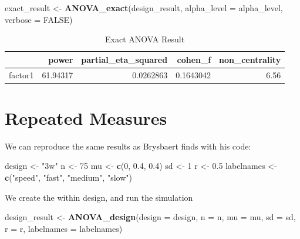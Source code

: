 \documentclass[
]{book}
\newenvironment{Shaded}{\begin{snugshade}}{\end{snugshade}}
\newcommand{\DataTypeTok}[1]{\textcolor[rgb]{0.13,0.29,0.53}{#1}}
\newcommand{\DecValTok}[1]{\textcolor[rgb]{0.00,0.00,0.81}{#1}}
\newcommand{\FloatTok}[1]{\textcolor[rgb]{0.00,0.00,0.81}{#1}}
\newcommand{\KeywordTok}[1]{\textcolor[rgb]{0.13,0.29,0.53}{\textbf{#1}}}
\newcommand{\NormalTok}[1]{#1}
\newcommand{\OtherTok}[1]{\textcolor[rgb]{0.56,0.35,0.01}{#1}}
\newcommand{\StringTok}[1]{\textcolor[rgb]{0.31,0.60,0.02}{#1}}
\begin{document}
\begin{Shaded}
\begin{Highlighting}[]
\NormalTok{exact_result <-}\StringTok{ }\KeywordTok{ANOVA_exact}\NormalTok{(design_result,}
                            \DataTypeTok{alpha_level =}\NormalTok{ alpha_level,}
                            \DataTypeTok{verbose =} \OtherTok{FALSE}\NormalTok{)}
\end{Highlighting}
\end{Shaded}

\begin{table}[!h]

\caption{\label{tab:unnamed-chunk-336}Exact ANOVA Result}
\centering
\begin{tabular}[t]{l|r|r|r|r}
\hline
  & power & partial\_eta\_squared & cohen\_f & non\_centrality\\
\hline
factor1 & 61.94317 & 0.0262863 & 0.1643042 & 6.56\\
\hline
\end{tabular}
\end{table}

\hypertarget{repeated-measures}{%
\section{Repeated Measures}\label{repeated-measures}}

We can reproduce the same results as Brysbaert finds with his code:

\begin{Shaded}
\begin{Highlighting}[]
\NormalTok{design <-}\StringTok{ "3w"}
\NormalTok{n <-}\StringTok{ }\DecValTok{75}
\NormalTok{mu <-}\StringTok{ }\KeywordTok{c}\NormalTok{(}\DecValTok{0}\NormalTok{, }\FloatTok{0.4}\NormalTok{, }\FloatTok{0.4}\NormalTok{)}
\NormalTok{sd <-}\StringTok{ }\DecValTok{1}
\NormalTok{r <-}\StringTok{ }\FloatTok{0.5}
\NormalTok{labelnames <-}\StringTok{ }\KeywordTok{c}\NormalTok{(}\StringTok{"speed"}\NormalTok{, }\StringTok{"fast"}\NormalTok{, }\StringTok{"medium"}\NormalTok{, }\StringTok{"slow"}\NormalTok{)}
\end{Highlighting}
\end{Shaded}

We create the within design, and run the simulation

\begin{Shaded}
\begin{Highlighting}[]
\NormalTok{design_result <-}\StringTok{ }\KeywordTok{ANOVA_design}\NormalTok{(}\DataTypeTok{design =}\NormalTok{ design,}
                   \DataTypeTok{n =}\NormalTok{ n, }
                   \DataTypeTok{mu =}\NormalTok{ mu, }
                   \DataTypeTok{sd =}\NormalTok{ sd, }
                   \DataTypeTok{r =}\NormalTok{ r, }
                   \DataTypeTok{labelnames =}\NormalTok{ labelnames)}
\end{Highlighting}
\end{Shaded}
\end{document}
